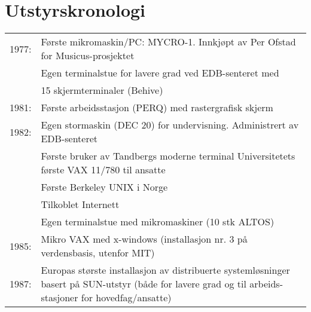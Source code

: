 \chapter*{Utstyrskronologi}

\begin{tabularx}{\textwidth}{ll}
	1977: & Første mikromaskin\slash PC: MYCRO-1. Innkjøpt av Per Ofstad for Musicus-prosjektet \\
	& Egen terminalstue for lavere grad ved EDB-senteret med \\
	& 15 skjermterminaler (Behive) \\
	1981: & Første arbeidsstasjon (PERQ) med rastergrafisk skjerm \\
	1982: & Egen stormaskin (DEC 20) for undervisning. Administrert av EDB-senteret \\
	& Første bruker av Tandbergs moderne terminal Universitetets første VAX 11/780 til ansatte \\
	& Første Berkeley UNIX i Norge \\
	& Tilkoblet Internett \\
	& Egen terminalstue med mikromaskiner (10 stk ALTOS) \\
	1985: & Mikro VAX med x-windows (installasjon nr. 3 på verdensbasis, utenfor MIT) \\
	1987: & Europas største installasjon av distribuerte systemløsninger basert på SUN-utstyr (både for lavere grad og til arbeids- stasjoner for hovedfag/ansatte) \\
\end{tabularx}